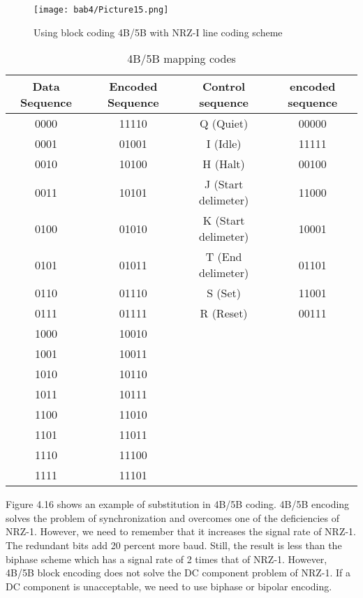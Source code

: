 \begin{figure}
  \centering
  \texttt{[image: bab4/Picture15.png]}
  \caption{Using block coding 4B/5B with NRZ-I line coding scheme}
  \label{fig4:15}
\end{figure}

\begin{table}
  \centering
  \caption{4B/5B mapping codes}
  \begin{tabular}{| c | c | c | c |}
    \hline
    Data Sequence & Encoded Sequence & Control sequence & encoded sequence \\
    \hline
    0000 & 11110 & Q (Quiet) & 00000 \\
    \hline  
    0001 & 01001 & I (Idle) & 11111 \\
    \hline
    0010 & 10100 & H (Halt) & 00100 \\
    \hline
    0011 & 10101 & J (Start delimeter) & 11000 \\
    \hline
    0100 & 01010 & K (Start delimeter) & 10001 \\
    \hline
    0101 & 01011 & T (End delimeter) & 01101 \\
    \hline
    0110 & 01110 & S (Set) & 11001 \\
    \hline
    0111 & 01111 & R (Reset) & 00111 \\
    \hline
    1000 & 10010 &  &  \\
    \hline
    1001 & 10011 &  &  \\
    \hline
    1010 & 10110 &  &  \\
    \hline
    1011 & 10111 &  &  \\
    \hline
    1100 & 11010 &  &  \\
    \hline
    1101 & 11011 &  &  \\
    \hline
    1110 & 11100 &  &  \\
    \hline
    1111 & 11101 &  &  \\
    \hline
  \end{tabular}
\end{table}

Figure 4.16 shows an example of substitution in 4B/5B coding. 4B/5B encoding solves the problem of synchronization and overcomes one of the deficiencies of NRZ-1. However, we need to remember that it increases the signal rate of NRZ-1. The redundant bits add 20 percent more baud. Still, the result is less than the biphase scheme which has a signal rate of 2 times that of NRZ-1. However, 4B/5B block encoding does not solve the DC component problem of NRZ-1. If a DC component is unacceptable, we need to use biphase or bipolar encoding.

